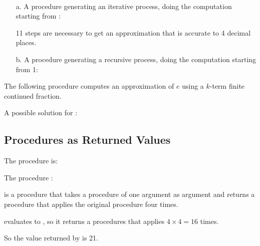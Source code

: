 \begin{exe}[1.37]
    \ \vspace{-20pt}
    \begin{itemize}
        \item[a.] A procedure  generating an iterative process, 
            doing the computation starting from :

            11 steps are necessary to get an approximation that is accurate to 
            4 decimal places.

        \item[b.] A procedure  generating a recursive process, 
            doing the computation starting from 1:
    \end{itemize}
\end{exe}

\begin{exe}[1.38]
    The following procedure computes an approximation of $e$ using a $k$-term 
    finite continued fraction.
\end{exe}

\begin{exe}[1.39]
    A possible solution for :
\end{exe}

\subsection{Procedures as Returned Values}

\begin{exe}[1.40]
    The procedure  is:
\end{exe}

\begin{exe}[1.41]
    The procedure :

     is a procedure that takes a procedure of one argument 
    as argument and returns a procedure that applies the original procedure four 
    times.

     evaluates to
    , so it returns a procedures 
    that applies  $4 \times 4 = 16$ times.

    So the value returned by  is 21.
\end{exe}

